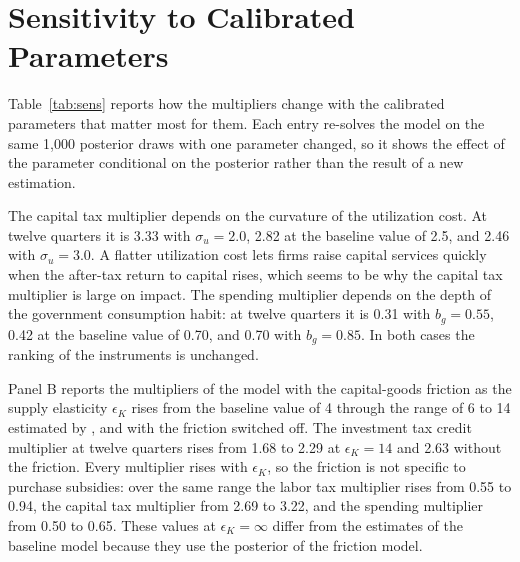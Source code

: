 \documentclass[article,11pt,letterpaper,fleqn]{article}
\theoremstyle{definition}
\numberwithin{equation}{section}
\begin{document}





\section{Sensitivity to Calibrated Parameters}
\label{sec:sens_params}

Table~\ref{tab:sens} reports how the multipliers change with the calibrated parameters that matter most for them. Each entry re-solves the model on the same 1{,}000 posterior draws with one parameter changed, so it shows the effect of the parameter conditional on the posterior rather than the result of a new estimation.

The capital tax multiplier depends on the curvature of the utilization cost. At twelve quarters it is 3.33 with $\sigma_u = 2.0$, 2.82 at the baseline value of 2.5, and 2.46 with $\sigma_u = 3.0$. A flatter utilization cost lets firms raise capital services quickly when the after-tax return to capital rises, which seems to be why the capital tax multiplier is large on impact. The spending multiplier depends on the depth of the government consumption habit: at twelve quarters it is 0.31 with $b_g = 0.55$, 0.42 at the baseline value of 0.70, and 0.70 with $b_g = 0.85$. In both cases the ranking of the instruments is unchanged.

Panel B reports the multipliers of the model with the capital-goods friction as the supply elasticity $\epsilon_K$ rises from the baseline value of 4 through the range of 6 to 14 estimated by \citet{House_Shapiro_2008}, and with the friction switched off. The investment tax credit multiplier at twelve quarters rises from 1.68 to 2.29 at $\epsilon_K = 14$ and 2.63 without the friction. Every multiplier rises with $\epsilon_K$, so the friction is not specific to purchase subsidies: over the same range the labor tax multiplier rises from 0.55 to 0.94, the capital tax multiplier from 2.69 to 3.22, and the spending multiplier from 0.50 to 0.65. These values at $\epsilon_K = \infty$ differ from the estimates of the baseline model because they use the posterior of the friction model.
\end{document}
